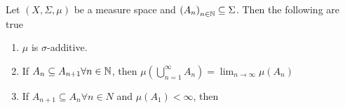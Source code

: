 \begin{thm}[]
  Let $(X, \Sigma, \mu)$ be a measure space and $\left(A_{n}\right)_{n \in \mathbb{N}} \subseteq \Sigma$. Then the following are true
  \begin{enumerate}
    \item $\mu$ is $\sigma$-additive.
    \item If $A_n \subseteq A_{n+1} \forall n \in \mathbb{N}$, then $\mu \left(\bigcup_{n=1}^{\infty}A_n \right) = \lim_{n \to \infty}\mu(A_n)$
    \item If $A_{n+1} \subseteq A_n \forall n \in N$ and $\mu(A_1) < \infty$, then

  \end{enumerate}
\end{thm}
